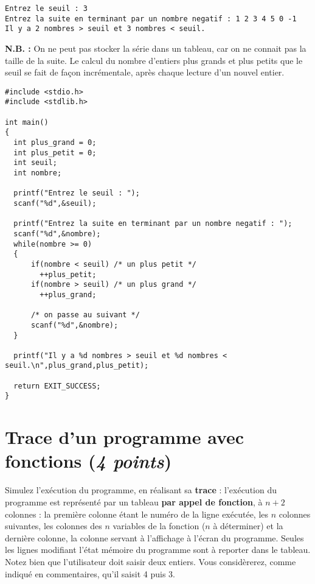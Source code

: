 \begin{verbatim}
Entrez le seuil : 3
Entrez la suite en terminant par un nombre negatif : 1 2 3 4 5 0 -1
Il y a 2 nombres > seuil et 3 nombres < seuil.
\end{verbatim}

\textbf{N.B. : } On ne peut pas stocker la série dans un tableau, car on ne connait pas la taille de la suite. Le calcul du nombre d'entiers plus grands et plus petits que le seuil se fait de façon incrémentale, après chaque lecture d'un nouvel entier.

\begin{correction}
\begin{verbatim}
#include <stdio.h>
#include <stdlib.h>

int main()
{
  int plus_grand = 0;
  int plus_petit = 0;
  int seuil;
  int nombre;

  printf("Entrez le seuil : ");
  scanf("%d",&seuil);

  printf("Entrez la suite en terminant par un nombre negatif : ");
  scanf("%d",&nombre);
  while(nombre >= 0)
  {
      if(nombre < seuil) /* un plus petit */
        ++plus_petit;
      if(nombre > seuil) /* un plus grand */
        ++plus_grand;

      /* on passe au suivant */
      scanf("%d",&nombre);
  }

  printf("Il y a %d nombres > seuil et %d nombres < seuil.\n",plus_grand,plus_petit);

  return EXIT_SUCCESS;
}

\end{verbatim}
\end{correction}

\section{Trace d'un programme avec fonctions (\textit{4 points})}
\label{tableau_sans_zero}

Simulez
  l'exécution du programme, en réalisant sa \textbf{trace} : l'exécution
  du programme est représenté par un tableau \textbf{par appel de fonction}, à $n + 2$ colonnes : la
  première colonne étant le numéro de la ligne exécutée, les $n$
  colonnes suivantes, les colonnes des $n$ variables de la fonction ($n$ à
  déterminer) et la dernière colonne, la colonne servant à
  l'affichage à l'écran du programme. Seules les lignes modifiant l'état mémoire du programme sont à reporter dans le tableau.
  Notez bien que l'utilisateur doit saisir deux entiers. Vous considèrerez, comme indiqué en commentaires, qu'il saisit 4 puis 3.

